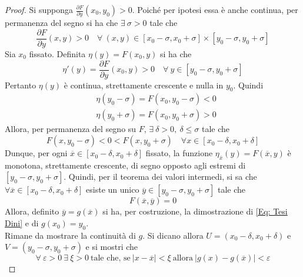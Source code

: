 \begin{proof}
        Si supponga $\frac{\partial{F}}{\partial{y}}(x_0,y_0) > 0$. Poiché per ipotesi essa è anche continua, per permanenza del segno si ha che $\exists\ \sigma > 0$ tale che
        \begin{equation}
            \frac{\partial{F}}{\partial{y}}(x,y) > 0 \quad \forall\ (x,y) \in [x_0-\sigma, x_0+\sigma]\times [y_0 - \sigma, y_0+\sigma]
        \end{equation}
       Sia $x_0$ fissato. Definita $\eta(y)=F(x_0, y)$ si ha che
       \begin{equation}
           \eta'(y)=\frac{\partial{F}}{\partial{y}}(x_0, y) >0 \quad \forall\ y \in [y_0 - \sigma, y_0+\sigma]
       \end{equation}
       Pertanto $\eta(y)$ è continua, strettamente crescente e nulla in $y_0$. Quindi
       \begin{equation}
       \begin{aligned}
           &\eta(y_0-\sigma)=F(x_0, y_0-\sigma)<0\\
           &\eta(y_0+\sigma)=F(x_0, y_0+\sigma)>0
       \end{aligned}
       \end{equation}
       Allora, per permanenza del segno su $F$, $\exists\ \delta>0,\ \delta \leq \sigma$ tale che 
       \begin{equation}
           F(x, y_0-\sigma) < 0 < F(x, y_0+\sigma) \quad \forall x \in [x_0-\delta, x_0+\delta]
       \end{equation}
       Dunque, per ogni $\overline{x} \in [x_0-\delta, x_0+\delta]$ fissato, la funzione $\eta_{\overline{x}}(y)=F(\overline{x}, y)$ è monotona, strettamente crescente, di segno opposto agli estremi di $[y_0 - \sigma, y_0+\sigma]$. Quindi, per il teorema dei valori intermedi, si sa che $\forall \overline{x} \in [x_0-\delta, x_0+\delta]$ esiste un unico $\overline{y} \in [y_0-\sigma, y_0+\sigma]$ tale che 
       \begin{equation}
           F(\overline{x}, \overline{y})=0
       \end{equation}
       Allora, definito $\overline{y}=g(\overline{x})$ si ha, per costruzione, la dimostrazione di \eqref{Eq: Tesi Dini} e di $g(x_0)=y_0$.\\
       Rimane da mostrare la continuità di $g$. Si dicano allora $U=(x_0-\delta, x_0+\delta)$ e $V=(y_0-\sigma, y_0+\sigma)$ e si mostri che
       \begin{equation}
           \forall\ \varepsilon > 0\ \exists\ \xi > 0\ \text{tale che, se}\ |x-\overline{x}|< \xi\ \text{allora}\ |g(x)-g(\overline{x})| < \varepsilon

\end{equation}
\end{proof}
